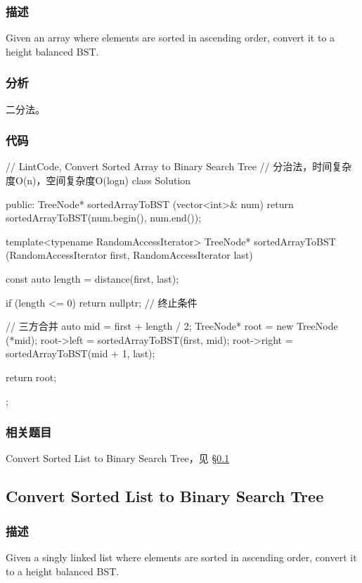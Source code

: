\subsubsection{描述}
Given an array where elements are sorted in ascending order, convert it to a height balanced BST.


\subsubsection{分析}
二分法。


\subsubsection{代码}

\begin{Code}
// LintCode, Convert Sorted Array to Binary Search Tree
// 分治法，时间复杂度O(n)，空间复杂度O(logn)
class Solution {
public:
    TreeNode* sortedArrayToBST (vector<int>& num) {
        return sortedArrayToBST(num.begin(), num.end());
    }

    template<typename RandomAccessIterator>
    TreeNode* sortedArrayToBST (RandomAccessIterator first,
            RandomAccessIterator last) {
        const auto length = distance(first, last);

        if (length <= 0) return nullptr;  // 终止条件

        // 三方合并
        auto mid = first + length / 2;
        TreeNode* root = new TreeNode (*mid);
        root->left = sortedArrayToBST(first, mid);
        root->right = sortedArrayToBST(mid + 1, last);

        return root;
    }
};
\end{Code}


\subsubsection{相关题目}
\begindot
\item Convert Sorted List to Binary Search Tree，见 \S \ref{sec:convert-sorted-list-to-binary-search-tree}
\myenddot


\subsection{Convert Sorted List to Binary Search Tree}
\label{sec:convert-sorted-list-to-binary-search-tree}


\subsubsection{描述}
Given a singly linked list where elements are sorted in ascending order, convert it to a height balanced BST.



